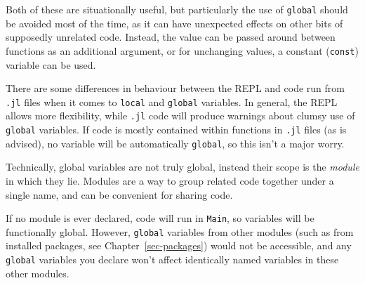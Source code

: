 \documentclass[
  letterpaper,
  DIV=11,
  numbers=noendperiod]{scrreprt}
\begin{document}
\begin{tcolorbox}[enhanced jigsaw, toprule=.15mm, opacitybacktitle=0.6, leftrule=.75mm, breakable, coltitle=black, bottomrule=.15mm, colbacktitle=quarto-callout-tip-color!10!white, bottomtitle=1mm, rightrule=.15mm, title=\textcolor{quarto-callout-tip-color}{\faLightbulb}\hspace{0.5em}{Convention}, colframe=quarto-callout-tip-color-frame, left=2mm, colback=white, opacityback=0, arc=.35mm, toptitle=1mm, titlerule=0mm]

Both of these are situationally useful, but particularly the use of
\texttt{global} should be avoided most of the time, as it can have
unexpected effects on other bits of supposedly unrelated code. Instead,
the value can be passed around between functions as an additional
argument, or for unchanging values, a constant (\texttt{const}) variable
can be used.

\end{tcolorbox}

There are some differences in behaviour between the REPL and code run
from \texttt{.jl} files when it comes to \texttt{local} and
\texttt{global} variables. In general, the REPL allows more flexibility,
while \texttt{.jl} code will produce warnings about clumsy use of
\texttt{global} variables. If code is mostly contained within functions
in \texttt{.jl} files (as is advised), no variable will be automatically
\texttt{global}, so this isn't a major worry.

\begin{tcolorbox}[enhanced jigsaw, toprule=.15mm, opacitybacktitle=0.6, leftrule=.75mm, breakable, coltitle=black, bottomrule=.15mm, colbacktitle=quarto-callout-note-color!10!white, bottomtitle=1mm, rightrule=.15mm, title=\textcolor{quarto-callout-note-color}{\faInfo}\hspace{0.5em}{Note}, colframe=quarto-callout-note-color-frame, left=2mm, colback=white, opacityback=0, arc=.35mm, toptitle=1mm, titlerule=0mm]

Technically, global variables are not truly global, instead their scope
is the \emph{module} in which they lie. Modules are a way to group
related code together under a single name, and can be convenient for
sharing code.

If no module is ever declared, code will run in \texttt{Main}, so
variables will be functionally global. However, \texttt{global}
variables from other modules (such as from installed packages, see
Chapter~\ref{sec-packages}) would not be accessible, and any
\texttt{global} variables you declare won't affect identically named
variables in these other modules.

\end{tcolorbox}
\end{document}

